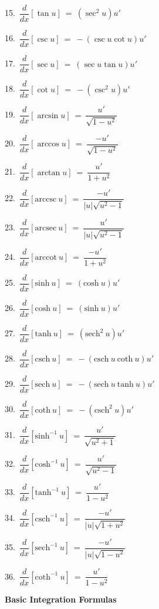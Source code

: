 \documentclass{article}
\begin{document}
\begin{large}
\begin{multicols}{2}
15.\ $\dfrac{d}{dx}[\tan u]\ =\ (\sec^{2} u)u'$

16.\ $\dfrac{d}{dx}[\csc u]\ =\ -(\csc u \cot u)u'$

17.\ $\dfrac{d}{dx}[\sec u]\ =\ (\sec u \tan u)u'$

18.\ $\dfrac{d}{dx}[\cot u]\ =\ -(\csc^{2} u)u'$

19.\ $\dfrac{d}{dx}[\arcsin u]\ =\ \dfrac{u'}{\sqrt{1-u^{2}}}$

20.\ $\dfrac{d}{dx}[\arccos u]\ =\ \dfrac{-u'}{\sqrt{1-u^{2}}}$

21.\ $\dfrac{d}{dx}[\arctan u]\ =\ \dfrac{u'}{1+u^{2}}$

22.\ $\dfrac{d}{dx}[\text{arccsc}\ u]\ =\ \dfrac{-u'}{|u|\sqrt{u^{2}-1}}$

23.\ $\dfrac{d}{dx}[\text{arcsec}\ u]\ =\ \dfrac{u'}{|u|\sqrt{u^{2}-1}}$

24.\ $\dfrac{d}{dx}[\text{arccot}\ u]\ =\ \dfrac{-u'}{1+u^{2}}$

25.\ $\dfrac{d}{dx}[\text{sinh}\ u]\ =\ (\text{cosh}\ u)u'$

26.\ $\dfrac{d}{dx}[\text{cosh}\ u]\ =\ (\text{sinh}\ u)u'$

27.\ $\dfrac{d}{dx}[\text{tanh}\ u]\ =\ (\text{sech}^{2}\ u)u'$

28.\ $\dfrac{d}{dx}[\text{csch}\ u]\ =\ -(\text{csch}\ u\ \text{coth}\ u)u'$

29.\ $\dfrac{d}{dx}[\text{sech}\ u]\ =\ -(\text{sech}\ u\ \text{tanh}\ u)u'$

30.\ $\dfrac{d}{dx}[\text{coth}\ u]\ =\ -(\text{csch}^{2}\ u)u'$

31.\ $\dfrac{d}{dx}\left[\text{sinh}^{-1}\ u\right]\ =\ \dfrac{u'}{\sqrt{u^{2}+1}}$

32.\ $\dfrac{d}{dx}\left[\text{cosh}^{-1}\ u\right]\ =\ \dfrac{u'}{\sqrt{u^{2}-1}}$

33.\ $\dfrac{d}{dx}\left[\text{tanh}^{-1}\ u\right]\ =\ \dfrac{u'}{1-u^{2}}$

34.\ $\dfrac{d}{dx}\left[\text{csch}^{-1}\ u\right]\ =\ \dfrac{-u'}{|u|\sqrt{1+u^{2}}}$

35.\ $\dfrac{d}{dx}\left[\text{sech}^{-1}\ u\right]\ =\ \dfrac{-u'}{|u|\sqrt{1-u^{2}}}$

36.\ $\dfrac{d}{dx}\left[\text{coth}^{-1}\ u\right]\ =\ \dfrac{u'}{1-u^{2}}$


\end{multicols}

\newpage

\textbf{Basic Integration Formulas}


\end{large}
\end{document}
